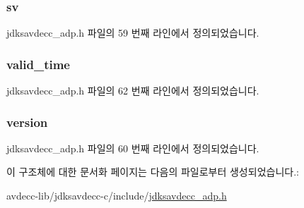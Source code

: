 \subsubsection[{\texorpdfstring{sv}{sv}}]{ sv}\hypertarget{structjdksavdecc__adpdu__common__control__header_a9eeedef9f348218323834a3cf44d64c4}{}\label{structjdksavdecc__adpdu__common__control__header_a9eeedef9f348218323834a3cf44d64c4}


jdksavdecc\+\_\+adp.\+h 파일의 59 번째 라인에서 정의되었습니다.

\subsubsection[{\texorpdfstring{valid\+\_\+time}{valid_time}}]{ valid\+\_\+time}\hypertarget{structjdksavdecc__adpdu__common__control__header_a936d4fc925e2d4001b93c159b094819b}{}\label{structjdksavdecc__adpdu__common__control__header_a936d4fc925e2d4001b93c159b094819b}


jdksavdecc\+\_\+adp.\+h 파일의 62 번째 라인에서 정의되었습니다.

\subsubsection[{\texorpdfstring{version}{version}}]{ version}\hypertarget{structjdksavdecc__adpdu__common__control__header_acd99bb05ca015e7d74448acb1deba7ca}{}\label{structjdksavdecc__adpdu__common__control__header_acd99bb05ca015e7d74448acb1deba7ca}


jdksavdecc\+\_\+adp.\+h 파일의 60 번째 라인에서 정의되었습니다.



이 구조체에 대한 문서화 페이지는 다음의 파일로부터 생성되었습니다.\+:\begin{DoxyCompactItemize}
\item 
avdecc-\/lib/jdksavdecc-\/c/include/\hyperlink{jdksavdecc__adp_8h}{jdksavdecc\+\_\+adp.\+h}\end{DoxyCompactItemize}
